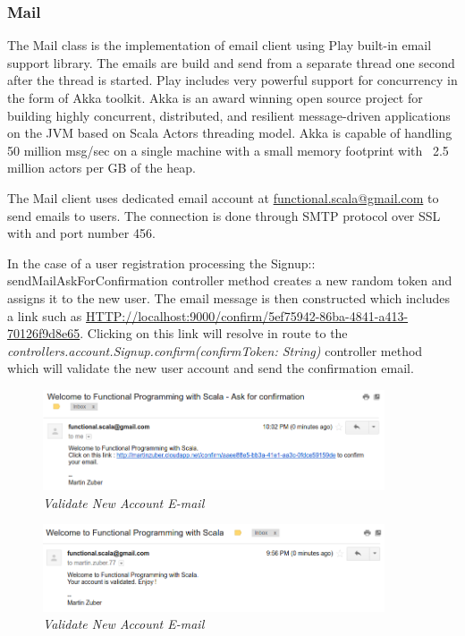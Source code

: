 \documentclass[12pt,twoside,a4paper]{report}
\begin{document}
\subsubsection{Mail}
The Mail class is the implementation of email client using Play built-in email support library. The emails are build and send from a separate thread one second after the thread is started. Play includes very powerful support for concurrency in the form of Akka toolkit.\cite{33} Akka is an award winning open source project for building highly concurrent,
distributed, and resilient message-driven applications on the JVM based on Scala Actors threading model. Akka is capable of handling 50 million msg/sec on a single machine with a small memory footprint with ~2.5 million actors per GB of the heap.

The Mail client uses dedicated email account at \url{functional.scala@gmail.com} to send emails to users. The connection is done through SMTP protocol over SSL with and port number 456.

In the case of a user registration processing the Signup:: sendMailAskForConfirmation controller method creates a new random token and assigns it to the new user. The email message is then constructed which includes a link such as \url{ HTTP://localhost:9000/confirm/5ef75942-86ba-4841-a413-70126f9d8e65}. Clicking on this link will resolve in route to the \emph{controllers.account.Signup.confirm(confirmToken: String)} controller method which will validate the new user account and send the confirmation email.

\begin{figure}[!ht]
	\centering
		\includegraphics[width=0.9\textwidth, totalheight=4cm]
		{register_confirmation_email}
	\caption{\textit{Validate New Account E-mail}}
	\label{f4.4.1.1}
\end{figure}

\begin{figure}[!ht]
	\centering
		\includegraphics[width=0.9\textwidth, totalheight=4cm]
		{register_notification_email}
	\caption{\textit{Validate New Account E-mail}}
	\label{f4.4.1.2}
\end{figure}
\end{document}
